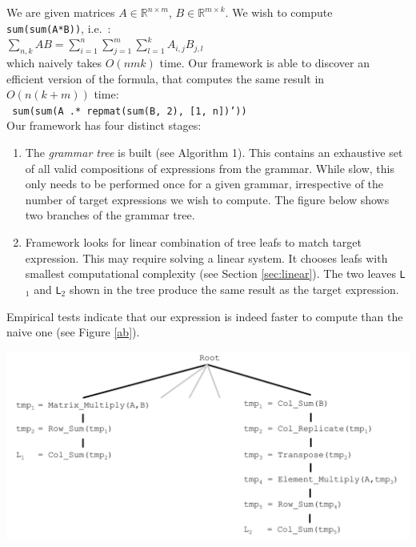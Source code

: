 \begin{minipage}{\linewidth}
\begin{framed}
\begin{flushleft}
We are given matrices $A \in \mathbb{R}^{n \times m}$, $B \in \mathbb{R}^{m \times k}$. We wish
 to compute \texttt{sum(sum(A*B))}, i.e.~: 
\vspace{1.5mm} \\ 
$\sum_{n,k} AB = \sum_{i = 1}^n \sum_{j = 1}^m \sum_{l = 1}^k A_{i, j} B_{j, l} $
\vspace{1.5mm} \\ 
which naively takes $O(nmk)$ time. Our framework is able to discover
an efficient version of the formula, that computes the same result in $O(n(k+m))$
time:
 \vspace{1mm} \\
\texttt{	sum(sum(A .* repmat(sum(B, 2), [1, n])'))}
 \vspace{1mm} \\ 
Our framework has four distinct stages:
 \begin{enumerate}
\item The {\em grammar tree} is built (see Algorithm 1). This contains
  an exhaustive set of all valid compositions of expressions from the
  grammar. While slow, this only needs to be performed once for a
  given grammar, irrespective of the number of target expressions we
  wish to compute. The figure below shows two branches of the grammar
  tree.
\item Framework looks for linear combination of tree leafs 
  to match target expression. This may require solving a linear system.
  It chooses leafs with smallest computational complexity 
  (see Section \ref{sec:linear}). The two leaves \texttt{L$_1$} and
  \texttt{L$_2$} shown in the tree produce the same result as the target
  expression. 
\end{enumerate}

Empirical tests indicate that our expression is indeed faster to
compute than the naive one (see Figure \ref{ab}).

\includegraphics[scale=0.4]{img/toy_tree.pdf}
\end{flushleft}
\end{framed}
\label{fig:example_ab}
\end{minipage}


